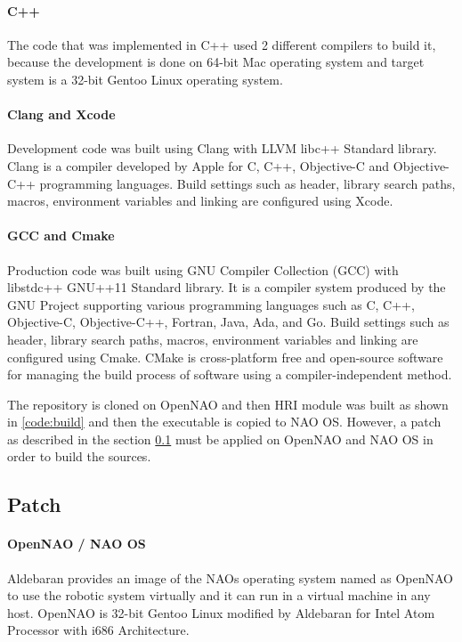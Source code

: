 \paragraph*{C++} The code that was implemented in C++ used 2 different compilers to build it, because the development is done on 64-bit Mac operating system and target system is a 32-bit Gentoo Linux operating system. 

\paragraph*{\indent Clang and Xcode} Development code was built using Clang with LLVM libc++ Standard library. Clang is a compiler developed by Apple for C, C++, Objective-C and Objective-C++ programming languages. Build settings such as header, library search paths, macros, environment variables and linking are configured using Xcode. 

\paragraph*{\indent GCC and Cmake} Production code was built using GNU Compiler Collection (GCC) with libstdc++ GNU++11 Standard library. It is a compiler system produced by the GNU Project supporting various programming languages such as C, C++, Objective-C, Objective-C++, Fortran, Java, Ada, and Go.  Build settings such as header, library search paths, macros, environment variables and linking are configured using Cmake. CMake is cross-platform free and open-source software for managing the build process of software using a compiler-independent method. 

The repository is cloned on OpenNAO and then HRI module was built as shown in \ref{code:build} and then the executable is copied to NAO OS. However, a patch as described in the section \ref{sec:patch} must be applied on OpenNAO and NAO OS in order to build the sources.

 \label{code:build}

\subsection{Patch} \label{sec:patch}
\paragraph*{OpenNAO / NAO OS} Aldebaran provides an image of the NAOs operating system named as OpenNAO to use the robotic system virtually and it can run in a virtual machine in any host. OpenNAO is 32-bit Gentoo Linux modified by Aldebaran for Intel Atom Processor with i686 Architecture. 

